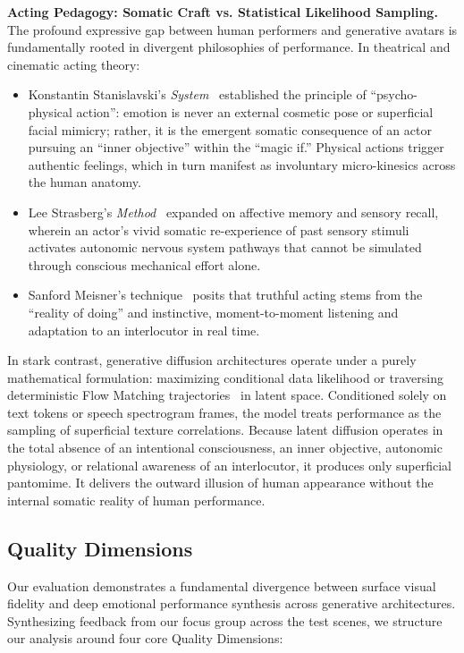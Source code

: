 \documentclass[pdflatex,sn-mathphys-num]{sn-jnl}
\theoremstyle{thmstyleone}
\theoremstyle{thmstyletwo}
\theoremstyle{thmstylethree}
\begin{document}
\textbf{Acting Pedagogy: Somatic Craft vs. Statistical Likelihood Sampling.} The profound expressive gap between human performers and generative avatars is fundamentally rooted in divergent philosophies of performance. In theatrical and cinematic acting theory:
\begin{itemize}
    \item Konstantin Stanislavski's \textit{System}~\cite{stanislavski1936actor} established the principle of ``psycho-physical action'': emotion is never an external cosmetic pose or superficial facial mimicry; rather, it is the emergent somatic consequence of an actor pursuing an ``inner objective'' within the ``magic if.'' Physical actions trigger authentic feelings, which in turn manifest as involuntary micro-kinesics across the human anatomy.
    \item Lee Strasberg's \textit{Method}~\cite{strasberg1987dream} expanded on affective memory and sensory recall, wherein an actor's vivid somatic re-experience of past sensory stimuli activates autonomic nervous system pathways that cannot be simulated through conscious mechanical effort alone.
    \item Sanford Meisner's technique~\cite{meisner1987acting} posits that truthful acting stems from the ``reality of doing'' and instinctive, moment-to-moment listening and adaptation to an interlocutor in real time.
\end{itemize}
In stark contrast, generative diffusion architectures operate under a purely mathematical formulation: maximizing conditional data likelihood or traversing deterministic Flow Matching trajectories~\cite{lipman2022flow} in latent space. Conditioned solely on text tokens or speech spectrogram frames, the model treats performance as the sampling of superficial texture correlations. Because latent diffusion operates in the total absence of an intentional consciousness, an inner objective, autonomic physiology, or relational awareness of an interlocutor, it produces only superficial pantomime. It delivers the outward illusion of human appearance without the internal somatic reality of human performance.

\subsection{Quality Dimensions}\label{sec5:technical}

Our evaluation demonstrates a fundamental divergence between surface visual fidelity and deep emotional performance synthesis across generative architectures. Synthesizing feedback from our focus group across the test scenes, we structure our analysis around four core Quality Dimensions:
\end{document}
